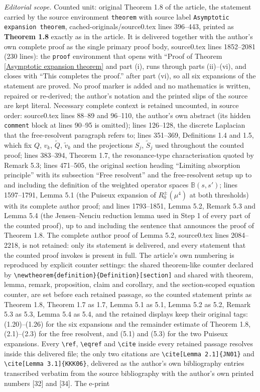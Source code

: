 \documentclass[10pt,a4paper]{amsart}
\newcommand\B{\mathbb{B}}
\numberwithin{equation}{section}
\begin{document}
\noindent\textit{Editorial scope.} Counted unit: original Theorem 1.8 of the article, the statement carried by the source environment \texttt{theorem} with source label \texttt{Asymptotic expansion theorem}, cached-originals/source0.tex lines 396--443, printed as \textbf{Theorem 1.8} exactly as in the article. It is delivered together with the author's own complete proof as the single primary proof body, source0.tex lines 1852--2081 (230 lines): the \texttt{proof} environment that opens with ``Proof of Theorem \ref{Asymptotic expansion theorem} and part (i), runs through parts (ii)--(vi), and closes with ``This completes the proof.'' after part (vi), so all six expansions of the statement are proved. No proof marker is added and no mathematics is written, repaired or re-derived; the author's notation and the printed slips of the source are kept literal. Necessary complete context is retained uncounted, in source order: source0.tex lines 88--89 and 96--110, the author's own abstract (its hidden \texttt{comment} block at lines 90--95 is omitted); lines 126--128, the discrete Laplacian that the free-resolvent paragraph refers to; lines 351--369, Definitions 1.4 and 1.5, which fix $Q$, $v_k$, $\widetilde{Q}$, $\widetilde{v}_k$ and the projections $S_j$, $\widetilde{S}_j$ used throughout the counted proof; lines 383--394, Theorem 1.7, the resonance-type characterisation quoted by Remark 5.3; lines 471--505, the original section heading ``Limiting absorption principle'' with its subsection ``Free resolvent'' and the free-resolvent setup up to and including the definition of the weighted operator spaces $\B(s,s')$; lines 1597--1791, Lemma 5.1 (the Puiseux expansion of $R_0^{\pm}(\mu^4)$ at both thresholds) with its complete author proof; and lines 1793--1851, Lemma 5.2, Remark 5.3 and Lemma 5.4 (the Jensen--Nenciu reduction lemma used in Step 1 of every part of the counted proof), up to and including the sentence that announces the proof of Theorem 1.8. The complete author proof of Lemma 5.2, source0.tex lines 2084--2218, is not retained: only its statement is delivered, and every statement that the counted proof invokes is present in full. The article's own numbering is reproduced by explicit counter settings: the shared theorem-like counter declared by \texttt{\textbackslash newtheorem\{definition\}\{Definition\}[section]} and shared with theorem, lemma, remark, proposition, claim and corollary, and the section-scoped equation counter, are set before each retained passage, so the counted statement prints as Theorem 1.8, Theorem 1.7 as 1.7, Lemma 5.1 as 5.1, Lemma 5.2 as 5.2, Remark 5.3 as 5.3, Lemma 5.4 as 5.4, and the retained displays keep their original tags: (1.20)--(1.26) for the six expansions and the remainder estimate of Theorem 1.8, (2.1)--(2.3) for the free resolvent, and (5.1) and (5.3) for the two Puiseux expansions. Every \texttt{\textbackslash ref}, \texttt{\textbackslash eqref} and \texttt{\textbackslash cite} inside every retained passage resolves inside this delivered file; the only two citations are \texttt{\textbackslash cite[Lemma 2.1]\{JN01\}} and \texttt{\textbackslash cite[Lemma 3.1]\{KKK06\}}, delivered as the author's own bibliography entries transcribed verbatim from the source bibliography with the author's own printed numbers [32] and [34]. The e-print 
\end{document}
